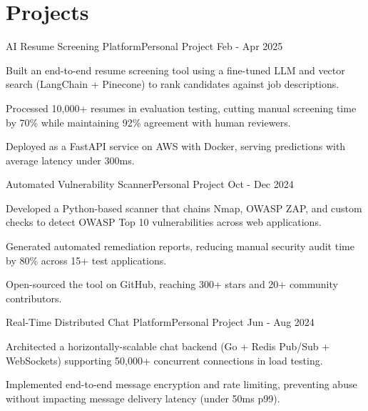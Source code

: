 \section{\textbf{Projects}}
\resumeSubHeadingListStart

\resumeEntry
    {AI Resume Screening Platform}{Personal Project}
    {}{Feb - Apr 2025}
    \resumeItemListStart
        \item {Built an end-to-end resume screening tool using a fine-tuned LLM and vector search (LangChain + Pinecone) to rank candidates against job descriptions.}
        \item {Processed 10,000+ resumes in evaluation testing, cutting manual screening time by 70\% while maintaining 92\% agreement with human reviewers.}
        \item {Deployed as a FastAPI service on AWS with Docker, serving predictions with average latency under 300ms.}
    \resumeItemListEnd
\vspace{-2mm}

\resumeEntry
    {Automated Vulnerability Scanner}{Personal Project}
    {}{Oct - Dec 2024}
    \resumeItemListStart
        \item {Developed a Python-based scanner that chains Nmap, OWASP ZAP, and custom checks to detect OWASP Top 10 vulnerabilities across web applications.}
        \item {Generated automated remediation reports, reducing manual security audit time by 80\% across 15+ test applications.}
        \item {Open-sourced the tool on GitHub, reaching 300+ stars and 20+ community contributors.}
    \resumeItemListEnd
\vspace{-2mm}

\resumeEntry
    {Real-Time Distributed Chat Platform}{Personal Project}
    {}{Jun - Aug 2024}
    \resumeItemListStart
        \item {Architected a horizontally-scalable chat backend (Go + Redis Pub/Sub + WebSockets) supporting 50,000+ concurrent connections in load testing.}
        \item {Implemented end-to-end message encryption and rate limiting, preventing abuse without impacting message delivery latency (under 50ms p99).}
    \resumeItemListEnd
\vspace{-2mm}

\resumeSubHeadingListEnd
\vspace{-8.5mm}
